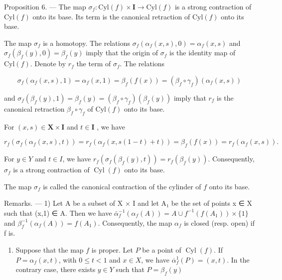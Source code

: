 Proposition 6. — The map \(\sigma_{f}\colon\mathrm{Cyl}(f)\times\mathbf{I}\to\mathrm{Cyl}(f)\) is a strong contraction of \(\mathrm{Cyl}(f)\) onto its base. Its term is the canonical retraction of \(\mathrm{Cyl}(f)\) onto its base.

The map \(\sigma_f\) is a homotopy. The relations \(\sigma_f(\alpha_f(x,s),0) = \alpha_f(x,s)\) and \(\sigma_f(\beta_f(y),0) = \beta_f(y)\) imply that the origin of \(\sigma_f\) is the identity map of \(\mathrm{Cyl}(f)\). Denote by \(r_f\) the term of \(\sigma_f\). The relations

\[
\sigma_ {f} \left(\alpha_ {f} (x, s), 1\right) = \alpha_ {f} (x, 1) = \beta_ {f} (f (x)) = \left(\beta_ {f} \circ \gamma_ {f}\right) \left(\alpha_ {f} (x, s)\right)
\]

and \(\sigma_{f}(\beta_{f}(y),1) = \beta_{f}(y) = (\beta_{f}\circ \gamma_{f})(\beta_{f}(y))\) imply that \(r_f\) is the canonical retraction \(\beta_{f}\circ \gamma_{f}\) of \(\mathrm{Cyl}(f)\) onto its base.

For \((x,s)\in \mathbf{X}\times \mathbf{I}\) and \(t\in \mathbf{I}\) , we have

\[
r _ {f} \left(\sigma_ {f} \left(\alpha_ {f} (x, s), t\right)\right) = r _ {f} \left(\alpha_ {f} (x, s (1 - t) + t)\right) = \beta_ {f} (f (x)) = r _ {f} \left(\alpha_ {f} (x, s)\right).
\]

For \(y \in Y\) and \(t \in I\), we have \(r_{f}(\sigma_{f}(\beta_{f}(y), t)) = r_{f}(\beta_{f}(y))\). Consequently, \(\sigma_{f}\) is a strong contraction of \(\operatorname{Cyl}(f)\) onto its base.

The map \(\sigma_{f}\) is called the canonical contraction of the cylinder of \(f\) onto its base.

Remarks. --- 1) Let A be a subset of X × I and let A₁ be the set of points x ∈ X such that (x,1) ∈ A. Then we have \(\bar{\alpha}_{f}^{-1}(\alpha_{f}(A)) = A \cup f^{-1}(f(A_{1})) \times \{1\}\) and \(\beta_{f}^{-1}(\alpha_{f}(A)) = f(A_{1})\). Consequently, the map \(\alpha_{f}\) is closed (resp. open) if f is.

\begin{enumerate}
\def\labelenumi{\arabic{enumi})}
\setcounter{enumi}{1}
\tightlist
\item
  Suppose that the map \(f\) is proper. Let \(P\) be a point of \(\operatorname{Cyl}(f)\). If \(P = \alpha_f(x,t)\), with \(0 \leqslant t < 1\) and \(x \in X\), we have \(\overline{\alpha}_f^1(P) = (x,t)\). In the contrary case, there exists \(y \in Y\) such that \(P = \beta_f(y)\)
\end{enumerate}

